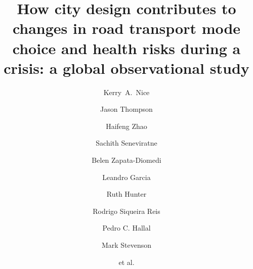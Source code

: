 \documentclass[preprint,12pt]{elsarticle}
\begin{document}
\begin{frontmatter}



\title{How city design contributes to changes in road transport mode choice and health risks during a crisis: a global observational study}


\author[melb]{Kerry~A.~Nice}
\author[melb]{Jason Thompson}
\author[melb]{Haifeng Zhao}
\author[melb]{Sachith Seneviratne}
\author[RMII]{Belen Zapata-Diomedi}
\author[Belfast]{Leandro Garcia}
\author[Belfast]{Ruth Hunter}
\author[wash]{Rodrigo Siqueira Reis}
\author[uill]{Pedro C. Hallal}
\author[melb,eng]{Mark Stevenson}
\author[melb]{et al.}

\address[melb]{Transport, Health, and Urban Systems Research Lab, Faculty of Architecture, Building, and Planning, University of Melbourne, VIC, Australia.}
\address[RMII]{Healthy Liveable Cities Lab, Centre for Urban Research, RMIT University, Melbourne, Australia.}
\address[Belfast]{Centre for Public Health, Queen’s University Belfast, Institute of Clinical Sciences B, Belfast, Northern Ireland, UK.}
\address[wash]{Washington University, St. Louis, Missouri, US.}
\address[eng]{Melbourne School of Engineering; and Melbourne School of Population and Global Health, University of Melbourne, VIC, Australia.}
\address[uill]{Department of Kinesiology and Community Health, University of Illinois Urbana-Champaign}


\end{frontmatter}
\end{document}

